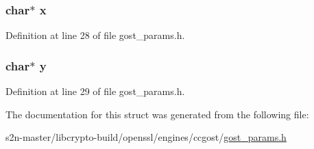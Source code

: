 \subsubsection[{\texorpdfstring{x}{x}}]{\setlength{\rightskip}{0pt plus 5cm}char$\ast$ x}\hypertarget{struct_r3410__2001_a87d9da60be62fb1a74b56404c392bf74}{}\label{struct_r3410__2001_a87d9da60be62fb1a74b56404c392bf74}


Definition at line 28 of file gost\+\_\+params.\+h.

\subsubsection[{\texorpdfstring{y}{y}}]{\setlength{\rightskip}{0pt plus 5cm}char$\ast$ y}\hypertarget{struct_r3410__2001_ad4d47f76a849e2c428e3dd7f8c4eab1f}{}\label{struct_r3410__2001_ad4d47f76a849e2c428e3dd7f8c4eab1f}


Definition at line 29 of file gost\+\_\+params.\+h.



The documentation for this struct was generated from the following file\+:\begin{DoxyCompactItemize}
\item 
s2n-\/master/libcrypto-\/build/openssl/engines/ccgost/\hyperlink{gost__params_8h}{gost\+\_\+params.\+h}\end{DoxyCompactItemize}
